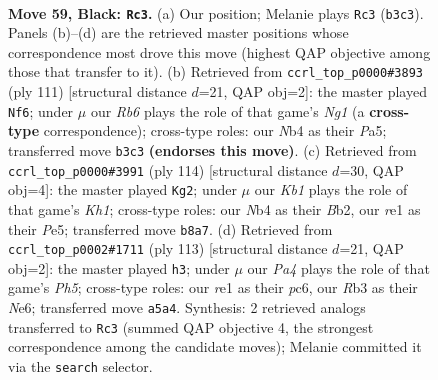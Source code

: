 \documentclass[11pt]{article}
\begin{document}
\clearpage

\begin{figure}[p]\centering
\begin{subfigure}{0.46\textwidth}\centering
\resizebox{\linewidth}{!}{%
\newchessgame
\chessboard[
  setfen={1k6/1p5p/6pP/p4p2/1n3P2/1r6/3R2K1/4R3 b - - 6 59},
  showmover=false,
  pgfstyle=straightmove, color=movearrow, markmove={b3-c3}
]}
\caption{}
\end{subfigure}\hfill
\begin{subfigure}{0.46\textwidth}\centering
\resizebox{\linewidth}{!}{%
\newchessgame
\chessboard[
  setfen={6n1/2p2k2/1p1p2p1/p7/2P2P2/5K2/P7/7R b - - 15 56},
  showmover=false,
  pgfstyle=straightmove, color=movearrow, markmove={g8-f6}
]}
\caption{}
\end{subfigure}
\\[4pt]
\begin{subfigure}{0.46\textwidth}\centering
\resizebox{\linewidth}{!}{%
\newchessgame
\chessboard[
  setfen={4b3/r5k1/3R4/4Pp2/5Pp1/6P1/1B6/7K w - - 0 58},
  showmover=false,
  pgfstyle=straightmove, color=movearrow, markmove={h1-g2}
]}
\caption{}
\end{subfigure}\hfill
\begin{subfigure}{0.46\textwidth}\centering
\resizebox{\linewidth}{!}{%
\newchessgame
\chessboard[
  setfen={8/8/p1P1n3/1p2k3/7p/PP2K1p1/8/5R2 b - - 3 57},
  showmover=false,
  pgfstyle=straightmove, color=movearrow, markmove={h4-h3}
]}
\caption{}
\end{subfigure}
\caption{\textbf{Move 59, Black: \texttt{Rc3}.} (a) Our position; Melanie plays \texttt{Rc3} (\texttt{b3c3}). Panels (b)--(d) are the retrieved master positions whose correspondence most drove this move (highest QAP objective among those that transfer to it). (b) Retrieved from \texttt{ccrl\_top\_p0000\#3893} (ply 111) [structural distance $d$=21, QAP obj=2]: the master played \texttt{Nf6}; under $\mu$ our \emph{Rb6} plays the role of that game's \emph{Ng1} (a \textbf{cross-type} correspondence); cross-type roles: our \emph{N}b4 as their \emph{P}a5; transferred move \texttt{b3c3} \textbf{(endorses this move)}. (c) Retrieved from \texttt{ccrl\_top\_p0000\#3991} (ply 114) [structural distance $d$=30, QAP obj=4]: the master played \texttt{Kg2}; under $\mu$ our \emph{Kb1} plays the role of that game's \emph{Kh1}; cross-type roles: our \emph{N}b4 as their \emph{B}b2, our \emph{r}e1 as their \emph{P}e5; transferred move \texttt{b8a7}. (d) Retrieved from \texttt{ccrl\_top\_p0002\#1711} (ply 113) [structural distance $d$=21, QAP obj=2]: the master played \texttt{h3}; under $\mu$ our \emph{Pa4} plays the role of that game's \emph{Ph5}; cross-type roles: our \emph{r}e1 as their \emph{p}c6, our \emph{R}b3 as their \emph{N}e6; transferred move \texttt{a5a4}. Synthesis: 2 retrieved analogs transferred to \texttt{Rc3} (summed QAP objective 4, the strongest correspondence among the candidate moves); Melanie committed it via the \texttt{search} selector.}
\label{fig:thought-m117}
\end{figure}
\end{document}
